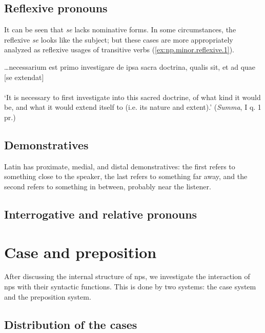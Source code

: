 \documentclass[a4paper, oneside, 12pt]{report}
\newcommand{\form}[1]{\emph{#1}}
\newcommand{\translate}[1]{`#1'}
\newcommand{\literature}[1]{\textit{#1}}
\begin{document}
\subsection{Reflexive pronouns}

It can be seen that \form{se} lacks nominative forms.
In some circumstances, 
the reflexive \form{se} looks like the subject;
but these cases are more appropriately analyzed 
as reflexive usages of transitive verbs
(\ref{ex:np.minor.reflexive.1}).

\begin{exe}
    \ex\label{ex:np.minor.reflexive.1} \gll \dots necessarium est primo investigare de ipsa sacra doctrina, 
    qualis sit, et ad quae [se extendat]  \\
    \\
    \glt \translate{It is necessary to first investigate into this sacred doctrine, 
    of what kind it would be, 
    and what it would extend itself to (i.e. its nature and extent).} (\literature{Summa}, I q. 1 pr.)
\end{exe}

\subsection{Demonstratives}

Latin has proximate, medial, and distal demonstratives:
the first refers to something close to the speaker, 
the last refers to something far away,
and the second refers to something in between,
probably near the listener.

\subsection{Interrogative and relative pronouns}



\section{Case and preposition}

After discussing the internal structure of \acs{np}s, 
we investigate the interaction of \acs{np}s 
with their syntactic functions.
This is done by two systems: 
the case system and the preposition system.


\subsection{Distribution of the cases}\label{sec:np.case-distribution}
\end{document}
